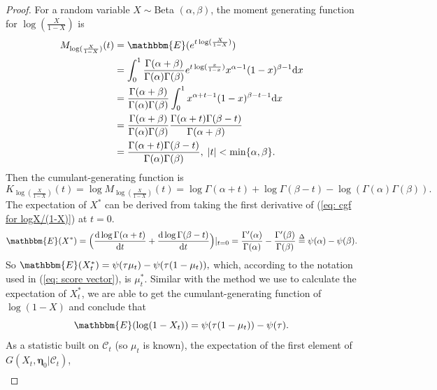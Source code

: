 \documentclass[10pt,a4paper]{amsart}
\begin{document}
\begin{proof}
For a random variable $X \sim $Beta $(\alpha,\beta)$, the moment generating function for $\log(\frac{X}{1-X})$ is 
\begin{equation*}
\begin{aligned}
    M_{\log(\frac{X}{1-X})}(t) &= \mathbbm{E}(e^{t\log(\frac{X}{1-X})}) \\
    &=\int_0^1\frac{\Gamma(\alpha+\beta)}{\Gamma(\alpha)\Gamma(\beta)}e^{t\log(\frac{x}{1-x})}x^{\alpha-1}(1-x)^{\beta-1} \text{d}x \\
        &= \frac{\Gamma(\alpha+\beta)}{\Gamma(\alpha)\Gamma(\beta)}\int_0^1 x^{\alpha+t-1}(1-x)^{\beta-t-1} \text{d}x \\
        &= \frac{\Gamma(\alpha+\beta)}{\Gamma(\alpha)\Gamma(\beta)} \frac{\Gamma(\alpha+t)\Gamma(\beta-t)}{\Gamma(\alpha+\beta)} \\
        &=\frac{\Gamma(\alpha+t)\Gamma(\beta-t)}{\Gamma(\alpha)\Gamma(\beta)}, \;|t|<\min\{\alpha,\beta\}.
\end{aligned}
\end{equation*}
Then the cumulant-generating function is 
\begin{equation}
\label{eq: cgf for logX/(1-X)}
    K_{\log(\frac{X}{1-X})}(t) = \log M_{\log(\frac{X}{1-X})}(t) =\log \Gamma(\alpha+t)+\log \Gamma(\beta-t)-\log(\Gamma(\alpha)\Gamma(\beta)).
\end{equation}
The expectation of $X^*$ can be derived from taking the first derivative of (\ref{eq: cgf for logX/(1-X)}) at $t=0$.
\begin{equation*}
    \mathbbm{E}(X^*) = \Big (\frac{\text{d}\log \Gamma(\alpha+t)}{\text{d}t}+ \frac{\text{d}\log \Gamma(\beta-t)}{\text{d}t} \Big) |_{t = 0} = \frac{\Gamma'(\alpha)}{\Gamma(\alpha)}-\frac{\Gamma'(\beta)}{\Gamma(\beta)} \overset{\Delta}{=} \psi(\alpha)-\psi(\beta).
\end{equation*}
So $\mathbbm{E}(X^*_t) = \psi(\tau \mu_t)-\psi(\tau (1-\mu_t)),$ which, according to the notation used in (\ref{eq: score vector}), is $\mu^*_t$. Similar with the method we use to calculate the expectation of $X^*_t$, we are able to get the cumulant-generating function of $\log(1-X)$ and conclude that
\begin{equation*}
    \mathbbm{E}(\log(1-X_t)) = \psi(\tau(1-\mu_t))-\psi(\tau).
\end{equation*}
As a statistic built on $\mathcal{C}_t$ (so $\mu_t$ is known), the expectation of the first element of $G(X_t, \bm{\eta}_0|\mathcal{C}_t)$,
\begin{equation*}
\begin{aligned}

\end{aligned}
\end{equation*}
\end{proof}
\end{document}
